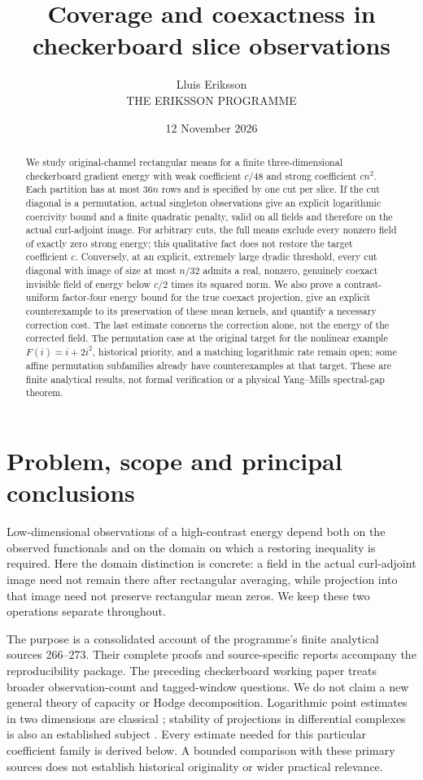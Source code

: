 \documentclass[11pt,a4paper]{article}
\title{Coverage and coexactness in checkerboard slice observations}
\author{Lluis Eriksson\\\small THE ERIKSSON PROGRAMME}
\date{12 November 2026}
\begin{document}
\maketitle
\begin{abstract}
We study original-channel rectangular means for a finite three-dimensional
checkerboard gradient energy with weak coefficient $c/48$ and strong coefficient
$cn^2$. Each partition has at most $36n$ rows and is specified by one cut per
slice. If the cut diagonal is a permutation, actual singleton observations give
an explicit logarithmic coercivity bound and a finite quadratic penalty, valid
on all fields and therefore on the actual curl-adjoint image. For arbitrary
cuts, the full means exclude every nonzero field of exactly zero strong energy;
this qualitative fact does not restore the target coefficient $c$. Conversely,
at an explicit, extremely large dyadic threshold, every cut diagonal with image
of size at most $n/32$ admits a real, nonzero, genuinely coexact invisible field
of energy below $c/2$ times its squared norm. We also prove a contrast-uniform
factor-four energy bound for the true coexact projection, give an explicit
counterexample to its preservation of these mean kernels, and quantify a
necessary correction cost. The last estimate concerns the correction alone,
not the energy of the corrected field. The permutation case at the original
target for the nonlinear example $F(i)=i+2i^2$, historical priority, and a
matching logarithmic rate remain open; some affine permutation subfamilies
already have counterexamples at that target.
These are finite analytical results, not formal verification or a physical
Yang--Mills spectral-gap theorem.
\end{abstract}

\section{Problem, scope and principal conclusions}
Low-dimensional observations of a high-contrast energy depend both on the
observed functionals and on the domain on which a restoring inequality is
required. Here the domain distinction is concrete: a field in the actual
curl-adjoint image need not remain there after rectangular averaging, while
projection into that image need not preserve rectangular mean zeros. We keep
these two operations separate throughout.

The purpose is a consolidated account of the programme's finite analytical
sources 266--273. Their complete proofs and source-specific reports accompany
the reproducibility package. The preceding checkerboard working paper
\cite{previous} treats broader observation-count and tagged-window questions.
We do not claim a new general theory of capacity or Hodge decomposition.
Logarithmic point estimates in two dimensions are classical
\cite{lawler}; stability of projections in differential complexes is also an
established subject \cite{afw}. Every estimate needed for this particular
coefficient family is derived below. A bounded comparison with these primary
sources does not establish historical originality or wider practical relevance.
\end{document}
